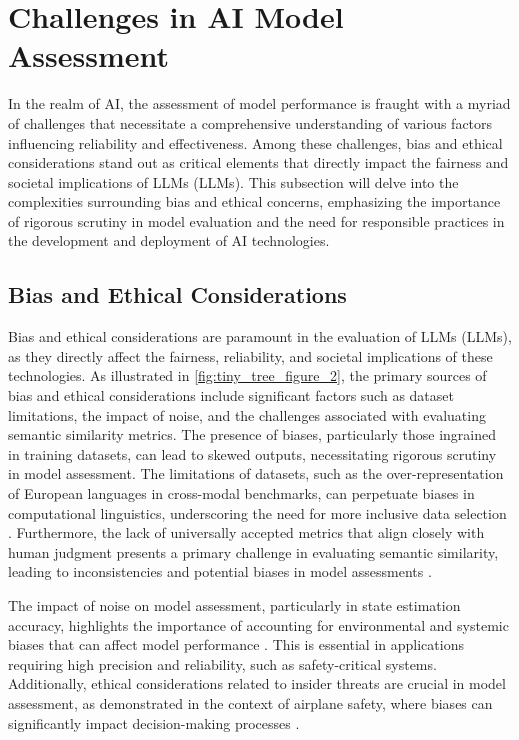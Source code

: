\section{Challenges in AI Model Assessment} \label{sec:Challenges in AI Model Assessment}

In the realm of AI, the assessment of model performance is fraught with a myriad of challenges that necessitate a comprehensive understanding of various factors influencing reliability and effectiveness. Among these challenges, bias and ethical considerations stand out as critical elements that directly impact the fairness and societal implications of LLMs (LLMs). This subsection will delve into the complexities surrounding bias and ethical concerns, emphasizing the importance of rigorous scrutiny in model evaluation and the need for responsible practices in the development and deployment of AI technologies.





\subsection{Bias and Ethical Considerations} \label{subsec:Bias and Ethical Considerations}

Bias and ethical considerations are paramount in the evaluation of LLMs (LLMs), as they directly affect the fairness, reliability, and societal implications of these technologies. As illustrated in \autoref{fig:tiny_tree_figure_2}, the primary sources of bias and ethical considerations include significant factors such as dataset limitations, the impact of noise, and the challenges associated with evaluating semantic similarity metrics. The presence of biases, particularly those ingrained in training datasets, can lead to skewed outputs, necessitating rigorous scrutiny in model assessment. The limitations of datasets, such as the over-representation of European languages in cross-modal benchmarks, can perpetuate biases in computational linguistics, underscoring the need for more inclusive data selection \cite{thapliyal2022crossmodal3600massivelymultilingualmultimodal}. Furthermore, the lack of universally accepted metrics that align closely with human judgment presents a primary challenge in evaluating semantic similarity, leading to inconsistencies and potential biases in model assessments \cite{yamshchikov2020styletransferparaphraselookingsensible}.

The impact of noise on model assessment, particularly in state estimation accuracy, highlights the importance of accounting for environmental and systemic biases that can affect model performance \cite{lathouwers2017memorypaysdiscordhidden}. This is essential in applications requiring high precision and reliability, such as safety-critical systems. Additionally, ethical considerations related to insider threats are crucial in model assessment, as demonstrated in the context of airplane safety, where biases can significantly impact decision-making processes \cite{kammller2020applyingisabelleinsiderframework}. 

